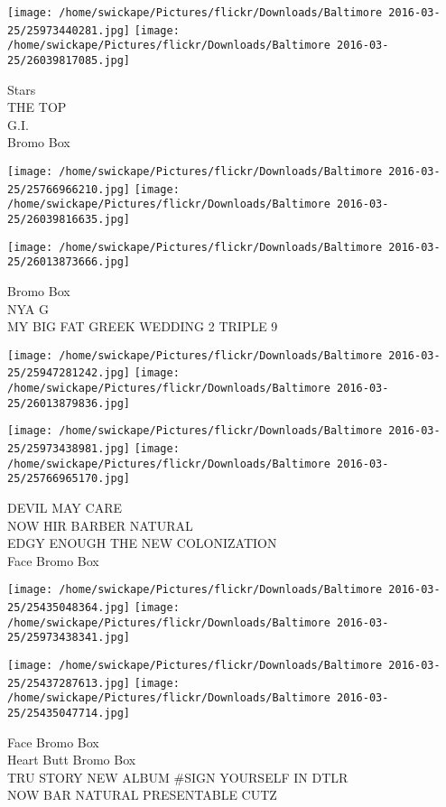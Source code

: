 \documentclass[10pt,letterpaper]{article}
\begin{document}
\texttt{[image: /home/swickape/Pictures/flickr/Downloads/Baltimore 2016-03-25/25973440281.jpg]}
\texttt{[image: /home/swickape/Pictures/flickr/Downloads/Baltimore 2016-03-25/26039817085.jpg]}

Stars\\
THE TOP\\
G.I.\\
Bromo Box
\pagebreak

\texttt{[image: /home/swickape/Pictures/flickr/Downloads/Baltimore 2016-03-25/25766966210.jpg]}
\texttt{[image: /home/swickape/Pictures/flickr/Downloads/Baltimore 2016-03-25/26039816635.jpg]}

\vspace{0.25in}
\texttt{[image: /home/swickape/Pictures/flickr/Downloads/Baltimore 2016-03-25/26013873666.jpg]}

Bromo Box\\
NYA G\\
MY BIG FAT GREEK WEDDING 2 TRIPLE 9
\pagebreak

\texttt{[image: /home/swickape/Pictures/flickr/Downloads/Baltimore 2016-03-25/25947281242.jpg]}
\texttt{[image: /home/swickape/Pictures/flickr/Downloads/Baltimore 2016-03-25/26013879836.jpg]}

\texttt{[image: /home/swickape/Pictures/flickr/Downloads/Baltimore 2016-03-25/25973438981.jpg]}
\texttt{[image: /home/swickape/Pictures/flickr/Downloads/Baltimore 2016-03-25/25766965170.jpg]}

DEVIL MAY CARE\\
NOW HIR BARBER NATURAL\\
EDGY ENOUGH THE NEW COLONIZATION\\
Face Bromo Box
\pagebreak

\texttt{[image: /home/swickape/Pictures/flickr/Downloads/Baltimore 2016-03-25/25435048364.jpg]}
\texttt{[image: /home/swickape/Pictures/flickr/Downloads/Baltimore 2016-03-25/25973438341.jpg]}

\texttt{[image: /home/swickape/Pictures/flickr/Downloads/Baltimore 2016-03-25/25437287613.jpg]}
\texttt{[image: /home/swickape/Pictures/flickr/Downloads/Baltimore 2016-03-25/25435047714.jpg]}

Face Bromo Box\\
Heart Butt Bromo Box\\
TRU STORY NEW ALBUM \#SIGN YOURSELF IN DTLR\\
NOW BAR NATURAL PRESENTABLE CUTZ
\pagebreak
\end{document}
